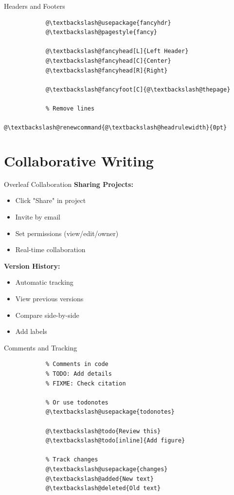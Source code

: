 \documentclass[aspectratio=169]{beamer}
\begin{document}
	\begin{frame}[fragile]{Headers and Footers}
		\begin{lstlisting}
			@\textbackslash@usepackage{fancyhdr}
			@\textbackslash@pagestyle{fancy}
			
			@\textbackslash@fancyhead[L]{Left Header}
			@\textbackslash@fancyhead[C]{Center}
			@\textbackslash@fancyhead[R]{Right}
			
			@\textbackslash@fancyfoot[C]{@\textbackslash@thepage}
			
			% Remove lines
			@\textbackslash@renewcommand{@\textbackslash@headrulewidth}{0pt}
		\end{lstlisting}
	\end{frame}
	
	\section{Collaborative Writing}
	
	\begin{frame}{Overleaf Collaboration}
		\textbf{Sharing Projects:}
		\begin{itemize}
			\item Click "Share" in project
			\item Invite by email
			\item Set permissions (view/edit/owner)
			\item Real-time collaboration
		\end{itemize}
		
		\vspace{1em}
		
		\textbf{Version History:}
		\begin{itemize}
			\item Automatic tracking
			\item View previous versions
			\item Compare side-by-side
			\item Add labels
		\end{itemize}
	\end{frame}
	
	\begin{frame}[fragile]{Comments and Tracking}
		\begin{lstlisting}
			% Comments in code
			% TODO: Add details
			% FIXME: Check citation
			
			% Or use todonotes
			@\textbackslash@usepackage{todonotes}
			
			@\textbackslash@todo{Review this}
			@\textbackslash@todo[inline]{Add figure}
			
			% Track changes
			@\textbackslash@usepackage{changes}
			@\textbackslash@added{New text}
			@\textbackslash@deleted{Old text}
		\end{lstlisting}
	\end{frame}
	
\end{document}
